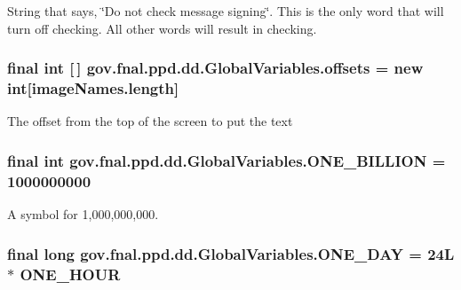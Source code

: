 String that says, \char`\"{}\-Do not check message signing\char`\"{}. This is the only word that will turn off checking. All other words will result in checking. \hypertarget{classgov_1_1fnal_1_1ppd_1_1dd_1_1GlobalVariables_aa46c72aaa61e4f90401679376f6071f5}{
\subsubsection[{offsets}]{\setlength{\rightskip}{0pt plus 5cm}final int \mbox{[}$\,$\mbox{]} gov.\-fnal.\-ppd.\-dd.\-Global\-Variables.\-offsets = new int\mbox{[}image\-Names.\-length\mbox{]}\hspace{0.3cm}{\ttfamily [static]}}}\label{classgov_1_1fnal_1_1ppd_1_1dd_1_1GlobalVariables_aa46c72aaa61e4f90401679376f6071f5}
The offset from the top of the screen to put the text \hypertarget{classgov_1_1fnal_1_1ppd_1_1dd_1_1GlobalVariables_a271c983add4bac415412025c8ac2f4cc}{
\subsubsection[{O\-N\-E\-\_\-\-B\-I\-L\-L\-I\-O\-N}]{\setlength{\rightskip}{0pt plus 5cm}final int gov.\-fnal.\-ppd.\-dd.\-Global\-Variables.\-O\-N\-E\-\_\-\-B\-I\-L\-L\-I\-O\-N = 1000000000\hspace{0.3cm}{\ttfamily [static]}}}\label{classgov_1_1fnal_1_1ppd_1_1dd_1_1GlobalVariables_a271c983add4bac415412025c8ac2f4cc}
A symbol for 1,000,000,000. \hypertarget{classgov_1_1fnal_1_1ppd_1_1dd_1_1GlobalVariables_aef5cbdf53c9830ae609987b805a08998}{
\subsubsection[{O\-N\-E\-\_\-\-D\-A\-Y}]{\setlength{\rightskip}{0pt plus 5cm}final long gov.\-fnal.\-ppd.\-dd.\-Global\-Variables.\-O\-N\-E\-\_\-\-D\-A\-Y = 24\-L $\ast$ O\-N\-E\-\_\-\-H\-O\-U\-R\hspace{0.3cm}{\ttfamily [static]}}}\label{classgov_1_1fnal_1_1ppd_1_1dd_1_1GlobalVariables_aef5cbdf53c9830ae609987b805a08998}
